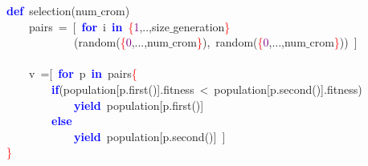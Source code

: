 \noindent
\mbox{}\textbf{\textcolor{Blue}{def}}\ selection\textcolor{BrickRed}{(}num$\_$crom\textcolor{BrickRed}{)} \\
\mbox{}\ \ \ \ pairs\ \textcolor{BrickRed}{=}\ \textcolor{BrickRed}{[}\ \textbf{\textcolor{Blue}{for}}\ i\ \textbf{\textcolor{Blue}{in}}\ \textcolor{Red}{\{}\textcolor{Purple}{1}\textcolor{BrickRed}{,..,}size$\_$generation\textcolor{Red}{\}} \\
\mbox{}\ \ \ \ \ \ \ \ \ \ \ \ \textcolor{BrickRed}{(}random\textcolor{BrickRed}{(}\textcolor{Red}{\{}\textcolor{Purple}{0}\textcolor{BrickRed}{,...,}num$\_$crom\textcolor{Red}{\}}\textcolor{BrickRed}{),}\ random\textcolor{BrickRed}{(}\textcolor{Red}{\{}\textcolor{Purple}{0}\textcolor{BrickRed}{,...,}num$\_$crom\textcolor{Red}{\}}\textcolor{BrickRed}{))}\ \textcolor{BrickRed}{]} \\
\mbox{} \\
\mbox{}\ \ \ \ v\ \textcolor{BrickRed}{=[}\ \textbf{\textcolor{Blue}{for}}\ p\ \textbf{\textcolor{Blue}{in}}\ pairs\textcolor{Red}{\{} \\
\mbox{}\ \ \ \ \ \ \ \ \textbf{\textcolor{Blue}{if}}\textcolor{BrickRed}{(}population\textcolor{BrickRed}{[}p\textcolor{BrickRed}{.}first\textcolor{BrickRed}{()].}fitness\ \textcolor{BrickRed}{\textless{}}\ population\textcolor{BrickRed}{[}p\textcolor{BrickRed}{.}second\textcolor{BrickRed}{()].}fitness\textcolor{BrickRed}{)} \\
\mbox{}\ \ \ \ \ \ \ \ \ \ \ \ \textbf{\textcolor{Blue}{yield}}\ population\textcolor{BrickRed}{[}p\textcolor{BrickRed}{.}first\textcolor{BrickRed}{()]} \\
\mbox{}\ \ \ \ \ \ \ \ \textbf{\textcolor{Blue}{else}} \\
\mbox{}\ \ \ \ \ \ \ \ \ \ \ \ \textbf{\textcolor{Blue}{yield}}\ population\textcolor{BrickRed}{[}p\textcolor{BrickRed}{.}second\textcolor{BrickRed}{()]}\ \textcolor{BrickRed}{]} \\
\mbox{}\textcolor{Red}{\}} \\
\mbox{}
